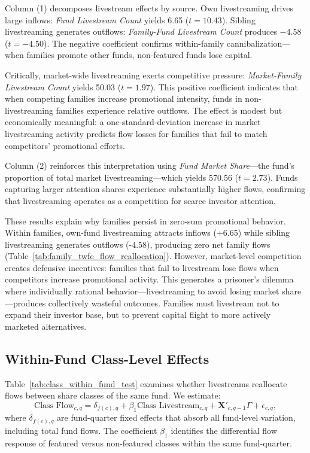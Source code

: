 \documentclass[12pt]{article}
\begin{document}
Column (1) decomposes livestream effects by source. Own livestreaming drives large inflows: \textit{Fund Livestream Count} yields 6.65 ($t = 10.43$). Sibling livestreaming generates outflows: \textit{Family-Fund Livestream Count} produces $-4.58$ ($t = -4.50$). The negative coefficient confirms within-family cannibalization—when families promote other funds, non-featured funds lose capital. 

Critically, market-wide livestreaming exerts competitive pressure: \textit{Market-Family Live\-stream Count} yields 50.03 ($t = 1.97$). This positive coefficient indicates that when competing families increase promotional intensity, funds in non-livestreaming families experience relative outflows. The effect is modest but economically meaningful: a one-standard-deviation increase in market livestreaming activity predicts flow losses for families that fail to match competitors' promotional efforts.

Column (2) reinforces this interpretation using \textit{Fund Market Share}—the fund's proportion of total market livestreaming—which yields 570.56 ($t = 2.73$). Funds capturing larger attention shares experience substantially higher flows, confirming that livestreaming operates as a competition for scarce investor attention.

These results explain why families persist in zero-sum promotional behavior. Within families, own-fund livestreaming attracts inflows (+6.65) while sibling livestreaming generates outflows (-4.58), producing zero net family flows (Table~\ref{tab:family_twfe_flow_reallocation}). However, market-level competition creates defensive incentives: families that fail to livestream lose flows when competitors increase promotional activity. This generates a prisoner's dilemma where individually rational behavior—livestreaming to avoid losing market share—produces collectively wasteful outcomes. Families must livestream not to expand their investor base, but to prevent capital flight to more actively marketed alternatives.

\subsection{Within-Fund Class-Level Effects}\label{subsec:within_fund}

Table~\ref{tab:class_within_fund_test} examines whether livestreams reallocate flows between share classes of the same fund. We estimate:
\begin{equation}
    \label{eq:class_flow}
    \text{Class Flow}_{c,q} = \delta_{f(c),q} + \beta_1 \text{Class Livestream}_{c,q} + \mathbf{X}'_{c,q-1} \Gamma + \epsilon_{c,q},
\end{equation}
where $\delta_{f(c),q}$ are fund-quarter fixed effects that absorb all fund-level variation, including total fund flows. The coefficient $\beta_1$ identifies the differential flow response of featured versus non-featured classes within the same fund-quarter.
\end{document}
